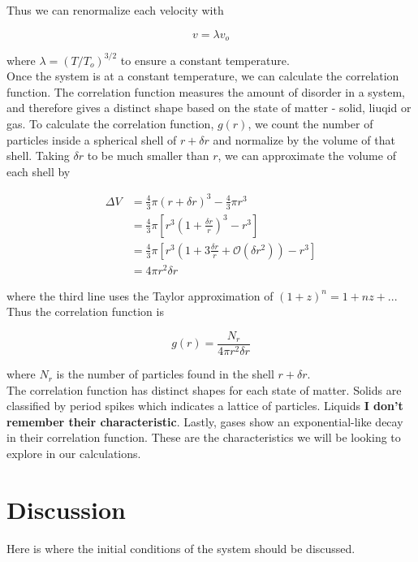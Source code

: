 \documentclass{article}
\begin{document}
\begin{multicols}{2}
\noindent Thus we can renormalize each velocity with 

\begin{equation}
v = \lambda v_o
\end{equation}

\noindent where $\lambda = (T/T_o)^{3/2}$ to ensure a constant temperature.  \\

Once the system is at a constant temperature, we can calculate the correlation function.  The correlation function measures the amount of disorder in a system, and therefore gives a distinct shape based on the state of matter - solid, liuqid or gas.  To calculate the correlation function, $g(r)$, we count the number of particles inside a spherical shell of $r + \delta r$ and normalize by the volume of that shell.  Taking $\delta r$ to be much smaller than $r$, we can approximate the volume of each shell by

\begin{equation}
\begin{split}
\Delta V & = \frac{4}{3} \pi (r+\delta r)^3 - \frac{4}{3} \pi r^3 \\
& = \frac{4}{3} \pi \left [ r^3 \left (1+\frac{\delta r}{r} \right )^3 - r^3 \right ] \\
& = \frac{4}{3} \pi \left [ r^3 \left ( 1 + 3\frac{\delta r}{r} + \mathcal{O} (\delta r ^2) \right ) - r^3 \right ] \\
& = 4 \pi r^2 \delta r
\end{split}
\end{equation}

\noindent where the third line uses the Taylor approximation of $(1+z)^n = 1 + nz+ ...$  Thus the correlation function is

\begin{equation}
g(r) = \frac{N_r}{4 \pi r^2 \delta r}
\end{equation}

\noindent where $N_r$ is the number of particles found in the shell $r + \delta r$.  \\

The correlation function has distinct shapes for each state of matter.  Solids are classified by period spikes which indicates a lattice of particles.  Liquids \textbf{I don't remember their characteristic}.  Lastly, gases show an exponential-like decay in their correlation function.  These are the characteristics we will be looking to explore in our calculations.

\section{Discussion}
\label{disc}
Here is where the initial conditions of the system should be discussed.

\end{multicols}
\end{document}
